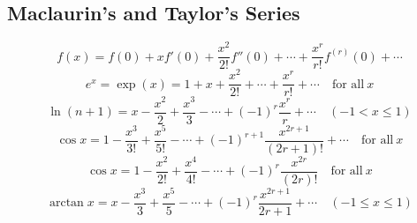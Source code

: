     \subsection{Maclaurin's and Taylor's Series}
    \begin{equation}
        f(x)=f(0)+xf'(0)+\frac{x^2}{2!}f''(0)+\cdots+\frac{x^r}{r!}f^{(r)}(0)+\cdots
    \end{equation}
    \begin{equation}
        e^x=\exp(x)=1+x+\frac{x^2}{2!}+\cdots+\frac{x^r}{r!}+\cdots\quad\text{for all}\ x
    \end{equation}
    \begin{equation}
        \ln(n+1)=x-\frac{x^2}{2}+\frac{x^3}{3}-\cdots+(-1)^r\frac{x^r}{r}+\cdots\quad(-1<x\le1)
    \end{equation}
    \begin{equation}
        \cos x=1-\frac{x^3}{3!}+\frac{x^5}{5!}-\cdots+(-1)^{r+1}\frac{x^{2r+1}}{(2r+1)!}+\cdots\quad\text{for all}\ x
    \end{equation}
    \begin{equation}
        \cos x=1-\frac{x^2}{2!}+\frac{x^4}{4!}-\cdots+(-1)^r\frac{x^{2r}}{(2r)!}\quad\text{for all}\ x
    \end{equation}
    \begin{equation}
        \arctan x=x-\frac{x^3}{3}+\frac{x^5}{5}-\cdots+(-1)^r\frac{x^{2r+1}}{2r+1}+\cdots\quad(-1\le x\le1)
    \end{equation}

